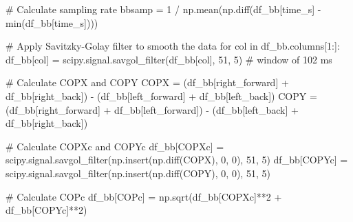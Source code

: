 \documentclass[
  letterpaper,
  DIV=11,
  numbers=noendperiod]{scrreprt}
\newenvironment{Shaded}{\begin{snugshade}}{\end{snugshade}}
\newcommand{\BuiltInTok}[1]{\textcolor[rgb]{0.00,0.23,0.31}{#1}}
\newcommand{\CommentTok}[1]{\textcolor[rgb]{0.37,0.37,0.37}{#1}}
\newcommand{\ControlFlowTok}[1]{\textcolor[rgb]{0.00,0.23,0.31}{#1}}
\newcommand{\DecValTok}[1]{\textcolor[rgb]{0.68,0.00,0.00}{#1}}
\newcommand{\KeywordTok}[1]{\textcolor[rgb]{0.00,0.23,0.31}{#1}}
\newcommand{\NormalTok}[1]{\textcolor[rgb]{0.00,0.23,0.31}{#1}}
\newcommand{\OperatorTok}[1]{\textcolor[rgb]{0.37,0.37,0.37}{#1}}
\newcommand{\StringTok}[1]{\textcolor[rgb]{0.13,0.47,0.30}{#1}}
\begin{document}
\begin{Shaded}
\begin{Highlighting}[]
    \CommentTok{\# Calculate sampling rate}
\NormalTok{    bbsamp }\OperatorTok{=} \DecValTok{1} \OperatorTok{/}\NormalTok{ np.mean(np.diff(df\_bb[}\StringTok{\textquotesingle{}time\_s\textquotesingle{}}\NormalTok{] }\OperatorTok{{-}} \BuiltInTok{min}\NormalTok{(df\_bb[}\StringTok{\textquotesingle{}time\_s\textquotesingle{}}\NormalTok{])))}

    \CommentTok{\# Apply Savitzky{-}Golay filter to smooth the data}
    \ControlFlowTok{for}\NormalTok{ col }\KeywordTok{in}\NormalTok{ df\_bb.columns[}\DecValTok{1}\NormalTok{:]:}
\NormalTok{        df\_bb[col] }\OperatorTok{=}\NormalTok{ scipy.signal.savgol\_filter(df\_bb[col], }\DecValTok{51}\NormalTok{, }\DecValTok{5}\NormalTok{) }\CommentTok{\# window of 102 ms}

    \CommentTok{\# Calculate COPX and COPY}
\NormalTok{    COPX }\OperatorTok{=}\NormalTok{ (df\_bb[}\StringTok{\textquotesingle{}right\_forward\textquotesingle{}}\NormalTok{] }\OperatorTok{+}\NormalTok{ df\_bb[}\StringTok{\textquotesingle{}right\_back\textquotesingle{}}\NormalTok{]) }\OperatorTok{{-}}\NormalTok{ (df\_bb[}\StringTok{\textquotesingle{}left\_forward\textquotesingle{}}\NormalTok{] }\OperatorTok{+}\NormalTok{ df\_bb[}\StringTok{\textquotesingle{}left\_back\textquotesingle{}}\NormalTok{])}
\NormalTok{    COPY }\OperatorTok{=}\NormalTok{ (df\_bb[}\StringTok{\textquotesingle{}right\_forward\textquotesingle{}}\NormalTok{] }\OperatorTok{+}\NormalTok{ df\_bb[}\StringTok{\textquotesingle{}left\_forward\textquotesingle{}}\NormalTok{]) }\OperatorTok{{-}}\NormalTok{ (df\_bb[}\StringTok{\textquotesingle{}left\_back\textquotesingle{}}\NormalTok{] }\OperatorTok{+}\NormalTok{ df\_bb[}\StringTok{\textquotesingle{}right\_back\textquotesingle{}}\NormalTok{])}

    \CommentTok{\# Calculate COPXc and COPYc }
\NormalTok{    df\_bb[}\StringTok{\textquotesingle{}COPXc\textquotesingle{}}\NormalTok{] }\OperatorTok{=}\NormalTok{ scipy.signal.savgol\_filter(np.insert(np.diff(COPX), }\DecValTok{0}\NormalTok{, }\DecValTok{0}\NormalTok{), }\DecValTok{51}\NormalTok{, }\DecValTok{5}\NormalTok{) }
\NormalTok{    df\_bb[}\StringTok{\textquotesingle{}COPYc\textquotesingle{}}\NormalTok{] }\OperatorTok{=}\NormalTok{ scipy.signal.savgol\_filter(np.insert(np.diff(COPY), }\DecValTok{0}\NormalTok{, }\DecValTok{0}\NormalTok{), }\DecValTok{51}\NormalTok{, }\DecValTok{5}\NormalTok{)}

    \CommentTok{\# Calculate COPc}
\NormalTok{    df\_bb[}\StringTok{\textquotesingle{}COPc\textquotesingle{}}\NormalTok{] }\OperatorTok{=}\NormalTok{ np.sqrt(df\_bb[}\StringTok{\textquotesingle{}COPXc\textquotesingle{}}\NormalTok{]}\OperatorTok{**}\DecValTok{2} \OperatorTok{+}\NormalTok{ df\_bb[}\StringTok{\textquotesingle{}COPYc\textquotesingle{}}\NormalTok{]}\OperatorTok{**}\DecValTok{2}\NormalTok{)}


\end{Highlighting}
\end{Shaded}
\end{document}
